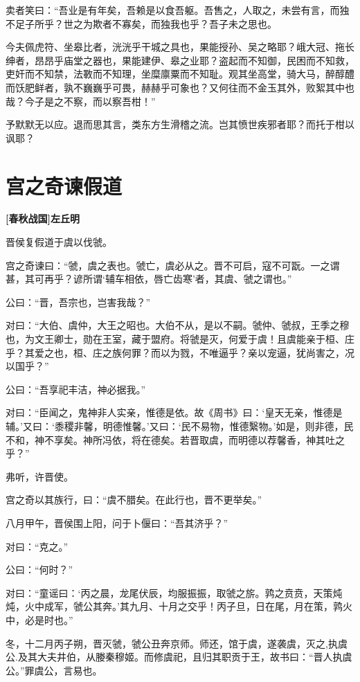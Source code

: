 \documentclass[UTF8,titlepage,oneside]{ctexbook}
\begin{document}
卖者笑曰：“吾业是有年矣，吾赖是以食吾躯。吾售之，人取之，未尝有言，而独不足子所乎？世之为欺者不寡矣，而独我也乎？吾子未之思也。


今夫佩虎符、坐皋比者，洸洸乎干城之具也，果能授孙、吴之略耶？峨大冠、拖长绅者，昂昂乎庙堂之器也，果能建伊、皋之业耶？盗起而不知御，民困而不知救，吏奸而不知禁，法斁而不知理，坐糜廪粟而不知耻。观其坐高堂，骑大马，醉醇醴而饫肥鲜者，孰不巍巍乎可畏，赫赫乎可象也？又何往而不金玉其外，败絮其中也哉？今子是之不察，而以察吾柑！”


予默默无以应。退而思其言，类东方生滑稽之流。岂其愤世疾邪者耶？而托于柑以讽耶？



\chapter*{宫之奇谏假道}
\begin{center}
	\textbf{[春秋战国]左丘明}
\end{center}


晋侯复假道于虞以伐虢。


宫之奇谏曰：“虢，虞之表也。虢亡，虞必从之。晋不可启，寇不可翫。一之谓甚，其可再乎？谚所谓‘辅车相依，唇亡齿寒’者，其虞、虢之谓也。”


公曰：“晋，吾宗也，岂害我哉？”


对曰：“大伯、虞仲，大王之昭也。大伯不从，是以不嗣。虢仲、虢叔，王季之穆也，为文王卿士，勋在王室，藏于盟府。将虢是灭，何爱于虞！且虞能亲于桓、庄乎？其爱之也，桓、庄之族何罪？而以为戮，不唯逼乎？亲以宠逼，犹尚害之，况以国乎？”


公曰：“吾享祀丰洁，神必据我。”


对曰：“臣闻之，鬼神非人实亲，惟德是依。故《周书》曰：‘皇天无亲，惟德是辅。’又曰：‘黍稷非馨，明德惟馨。’又曰：‘民不易物，惟德繄物。’如是，则非德，民不和，神不享矣。神所冯依，将在德矣。若晋取虞，而明德以荐馨香，神其吐之乎？”


弗听，许晋使。


宫之奇以其族行，曰：“虞不腊矣。在此行也，晋不更举矣。”


八月甲午，晋侯围上阳，问于卜偃曰：“吾其济乎？”


对曰：“克之。”


公曰：“何时？”


对曰：“童谣曰：‘丙之晨，龙尾伏辰，均服振振，取虢之旂。鹑之贲贲，天策炖炖，火中成军，虢公其奔。’其九月、十月之交乎！丙子旦，日在尾，月在策，鹑火中，必是时也。”


冬，十二月丙子朔，晋灭虢，虢公丑奔京师。师还，馆于虞，遂袭虞，灭之,执虞公.及其大夫井伯，从媵秦穆姬。而修虞祀，且归其职贡于王，故书曰：“晋人执虞公。”罪虞公，言易也。
\end{document}
